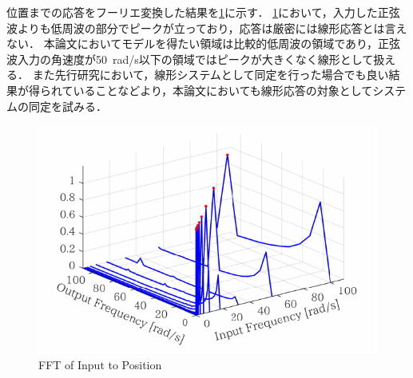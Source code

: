 位置までの応答をフーリエ変換した結果を\figname\ref{fig:crop-pos_FFT}に示す．
\figname\ref{fig:crop-pos_FFT}において，入力した正弦波よりも低周波の部分でピークが立っており，応答は厳密には線形応答とは言えない．
本論文においてモデルを得たい領域は比較的低周波の領域であり，正弦波入力の角速度が\SI{50}{rad/s}以下の領域ではピークが大きくなく線形として扱える．
また先行研究において，線形システムとして同定を行った場合でも良い結果が得られていることなどより，本論文においても線形応答の対象としてシステムの同定を試みる．
\begin{figure}[t]
    \centering
        \includegraphics[keepaspectratio, scale=1.0]{contents/SystemIdentification/figure/crop-pos_FFT.pdf}
        \caption{FFT of Input to Position}
        \label{fig:crop-pos_FFT}
\end{figure}

